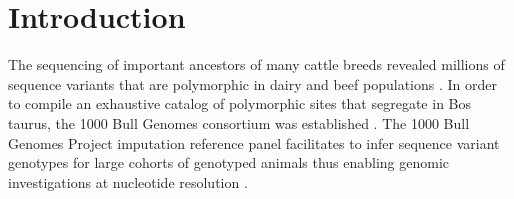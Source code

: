 \documentclass[../main.tex]{subfiles}
\begin{document}
\newpage

\section{Introduction}

\linespread{1.25}
\normalsize
The sequencing of important ancestors of many cattle breeds revealed millions of sequence variants that are polymorphic in dairy and beef populations \citep{Hoff2017,Stothard2015,Boussaha2016,Jansen2013}. In order to compile an exhaustive catalog of polymorphic sites that segregate in Bos taurus, the 1000 Bull Genomes consortium was established \citep{Daetwyler2014,Hayes2019}. 
The 1000 Bull Genomes Project imputation reference panel facilitates to infer sequence variant genotypes for large cohorts of genotyped animals thus enabling genomic investigations at nucleotide resolution \citep{Daetwyler2014,Pausch2017,Bouwman2018,Raymond2018}.
\end{document}
